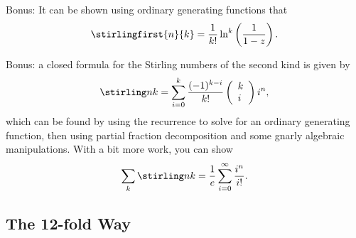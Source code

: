 Bonus: It can be shown using ordinary generating functions that
\begin{align*}
\stirlingfirst{n}{k} = \frac { 1 } { k ! } \ln ^ { k } \left( \frac { 1 } { 1 - z } \right).
\end{align*}

Bonus: a closed formula for the Stirling numbers of the second kind is
given by
\begin{align*}
\stirling n k = \sum _ { i = 0 } ^ { k } \frac { ( - 1 ) ^ { k - i } } { k ! } \left( \begin{array} { l } { k } \\ { i } \end{array} \right) i ^ { n },
\end{align*} which can be found by using the recurrence to solve for an
ordinary generating function, then using partial fraction decomposition
and some gnarly algebraic manipulations. With a bit more work, you can
show
\begin{align*}
\sum_k \stirling n k = \frac 1 e \sum_{i=0}^\infty \frac{i^n}{i!}.
\end{align*}

\hypertarget{the-12-fold-way}{%
\subsection{The 12-fold Way}\label{the-12-fold-way}}

